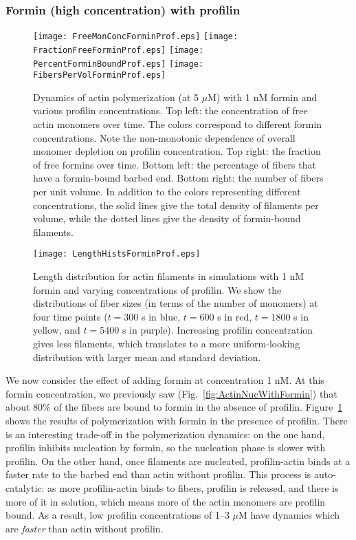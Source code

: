 \documentclass[11pt]{article}
\begin{document}
\subsubsection{Formin (high concentration) with profilin}
\begin{figure}
\centering
\texttt{[image: FreeMonConcForminProf.eps]}
\texttt{[image: FractionFreeForminProf.eps]}
\texttt{[image: PercentForminBoundProf.eps]}
\texttt{[image: FibersPerVolForminProf.eps]}
\caption{\label{fig:ActinForProf}Dynamics of actin polymerization (at 5 $\mu$M) with 1 nM formin and various profilin concentrations. Top left: the concentration of free actin monomers over time. The colors correspond to different formin concentrations. Note the non-monotonic dependence of overall monomer depletion on profilin concentration. Top right: the fraction of free formins over time. Bottom left: the percentage of fibers that have a formin-bound barbed end. Bottom right: the number of fibers per unit volume. In addition to the colors representing different concentrations, the solid lines give the total density of filaments per volume, while the dotted lines give the density of formin-bound filaments.}
\end{figure}

\begin{figure}
\centering
\texttt{[image: LengthHistsForminProf.eps]}
\caption{\label{fig:HistsForProf}Length distribution for actin filaments in simulations with 1 nM formin and varying concentrations of profilin. We show the distributions of fiber sizes (in terms of the number of monomers) at four time points ($t=300$ s in blue, $t=600$ s in red, $t=1800$ s in yellow, and $t=5400$ s in purple). Increasing profilin concentration gives less filaments, which translates to a more uniform-looking distribution with larger mean and standard deviation.}
\end{figure}


We now consider the effect of adding formin at concentration 1 nM. At this formin concentration, we previously saw (Fig.\ \ref{fig:ActinNucWithFormin}) that about 80\% of the fibers are bound to formin in the absence of profilin. Figure\ \ref{fig:ActinForProf} shows the results of polymerization with formin in the presence of profilin. There is an interesting trade-off in the polymerization dynamics: on the one hand, profilin inhibits nucleation by formin, so the nucleation phase is slower with profilin. On the other hand, once filaments are nucleated, profilin-actin binds at a faster rate to the barbed end than actin without profilin. This process is auto-catalytic: as more profilin-actin binds to fibers, profilin is released, and there is more of it in solution, which means more of the actin monomers are profilin bound. As a result, low profilin concentrations of 1--3 $\mu$M have dynamics which are \emph{faster} than actin without profilin.
\end{document}
